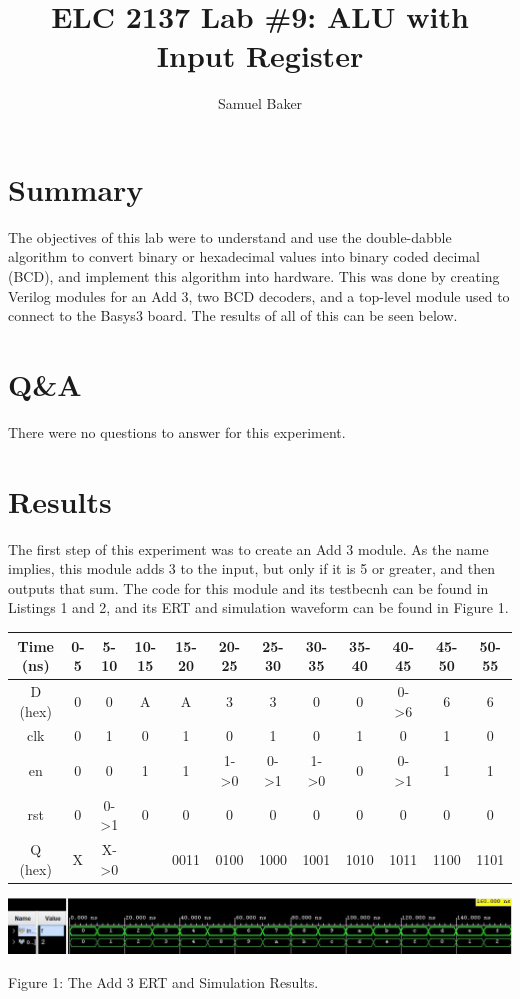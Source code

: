 \documentclass[11pt]{article}
\begin{document}
\title{ELC 2137 Lab \#9: ALU with Input Register}
\author{Samuel Baker}

\maketitle


\section*{Summary}

The objectives of this lab were to understand and use the double-dabble algorithm to convert binary or hexadecimal values into binary coded decimal (BCD), and implement this algorithm into hardware. This was done by creating Verilog modules for an Add 3, two BCD decoders, and a top-level module used to connect to the Basys3 board. The results of all of this can be seen below. 


\section*{Q\&A}

There were no questions to answer for this experiment.

\section*{Results}

The first step of this experiment was to create an Add 3 module. As the name implies, this module adds 3 to the input, but only if it is 5 or greater, and then outputs that sum. The code for this module and its testbecnh can be found in Listings 1 and 2, and its ERT and simulation waveform can be found in Figure 1.

\begin{center}

	
	\begin{tabular}{c|ccccccccccc}
		\toprule
		Time (ns) & 0-5 & 5-10 & 10-15 & 15-20 & 20-25 & 25-30 & 30-35 & 35-40 & 40-45 & 45-50 & 50-55\\
		\midrule
		D (hex) & 0 & 0 & A & A & 3 & 3 & 0 & 0 & 0->6 & 6 & 6\\
		clk & 0 & 1 & 0 & 1 & 0 & 1 & 0 & 1 & 0 & 1 & 0\\
		en & 0 & 0 & 1 & 1 & 1->0 & 0->1 & 1->0 & 0 & 0->1 & 1 & 1\\
		rst & 0 & 0->1 & 0 & 0 & 0 & 0 & 0 & 0 & 0 & 0 & 0\\
		\midrule
		Q (hex) & X & X->0 &  & 0011 & 0100 & 1000 & 1001 & 1010 & 1011 & 1100 & 1101\\
		\bottomrule
	\end{tabular} 
	
	
	\includegraphics[width=\textwidth]{add3.jpg}
	
	Figure 1: The Add 3 ERT and Simulation Results.
\end{center}
\end{document}
